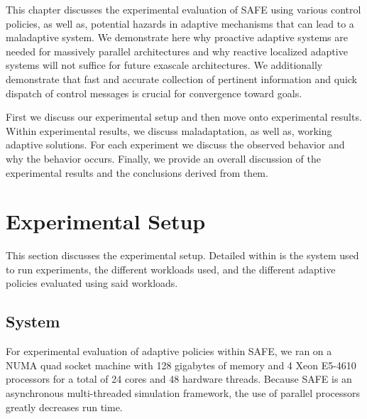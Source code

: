 \label{chap:results}
This chapter discusses the experimental evaluation of SAFE using various control policies, as well as, potential hazards in adaptive mechanisms that can lead to a maladaptive system. We demonstrate here why proactive adaptive systems are needed for massively parallel architectures and why reactive localized adaptive systems will not suffice for future exascale architectures. We additionally demonstrate that fast and accurate collection of pertinent information and quick dispatch of control messages is crucial for convergence toward goals.

First we discuss our experimental setup and then move onto experimental results. Within experimental results, we discuss maladaptation, as well as, working adaptive solutions. For each experiment we discuss the observed behavior and why the behavior occurs. Finally, we provide an overall discussion of the experimental results and the conclusions derived from them.

\section{Experimental Setup}
    This section discusses the experimental setup. Detailed within is the system used to run experiments, the different workloads used, and the different adaptive policies evaluated using said workloads. 
    \subsection{System}
        For experimental evaluation of adaptive policies within SAFE, we ran on a NUMA quad socket machine with 128 gigabytes of memory and 4 Xeon E5-4610 processors for a total of 24 cores and 48 hardware threads. Because SAFE is an asynchronous multi-threaded simulation framework, the use of parallel processors greatly decreases run time.
